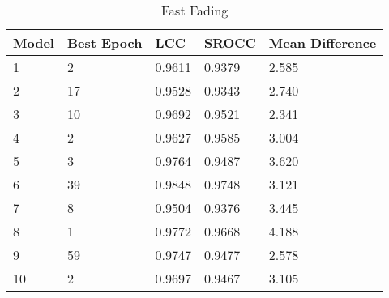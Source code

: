 \begin{table}[!ht]
\centering
\caption{Fast Fading}
\label{my-label}
\begin{tabular}{|l|l|l|l|l|}
\hline
Model & Best Epoch & LCC    & SROCC  & Mean Difference \\ \hline
1     & 2          & 0.9611 & 0.9379 & 2.585           \\ \hline
2     & 17         & 0.9528 & 0.9343 & 2.740           \\ \hline
3     & 10         & 0.9692 & 0.9521 & 2.341           \\ \hline
4     & 2          & 0.9627 & 0.9585 & 3.004           \\ \hline
5     & 3          & 0.9764 & 0.9487 & 3.620           \\ \hline
6     & 39         & 0.9848 & 0.9748 & 3.121           \\ \hline
7     & 8          & 0.9504 & 0.9376 & 3.445           \\ \hline
8     & 1          & 0.9772 & 0.9668 & 4.188           \\ \hline
9     & 59         & 0.9747 & 0.9477 & 2.578           \\ \hline
10    & 2          & 0.9697 & 0.9467 & 3.105           \\ \hline
\end{tabular}
\end{table}

\newpage